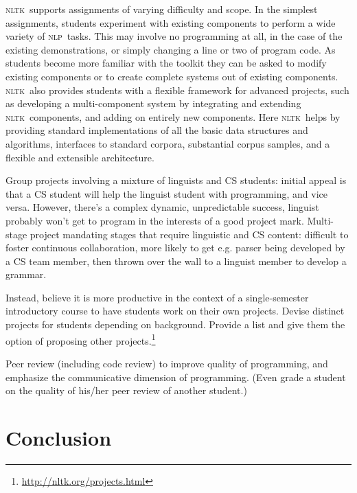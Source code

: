 \documentclass[11pt]{article}
\newcommand{\NLP}{\textsc{nlp}}
\newcommand{\NLTK}{\textsc{nltk}}
\begin{document}
\NLTK\ supports assignments of varying difficulty and scope. In the
simplest assignments, students experiment with existing components to
perform a wide variety of \NLP\ tasks. This may involve no programming
at all, in the case of the existing demonstrations, or simply changing
a line or two of program code. As students become more familiar with
the toolkit they can be asked to modify existing components or to
create complete systems out of existing components. \NLTK\ also provides
students with a flexible framework for advanced projects, such as
developing a multi-component system by integrating and extending \NLTK\
components, and adding on entirely new components. Here \NLTK\ helps by
providing standard implementations of all the basic data structures
and algorithms, interfaces to standard corpora, substantial corpus
samples, and a flexible and extensible architecture.

Group projects involving a mixture of linguists and CS students:
initial appeal is that a CS student will help the linguist student with programming,
and vice versa.  However, there's a
complex dynamic, unpredictable success, linguist probably won't get to program
in the interests of a good project mark.
Multi-stage project mandating stages that require linguistic and CS content: difficult
to foster continuous collaboration, more likely to get e.g. parser being developed by
a CS team member, then thrown over the wall to a linguist member to develop a grammar.

Instead, believe it is more productive in the context of a single-semester introductory
course to have students work on their own projects.  Devise distinct projects for
students depending on background.  Provide a list and give them the option of proposing
other projects.\footnote{\url{http://nltk.org/projects.html}}

Peer review (including code review) to improve quality of programming, and
emphasize the communicative dimension of programming.
(Even grade a student on the quality of his/her peer review of another student.)

\section{Conclusion}






\end{document}
